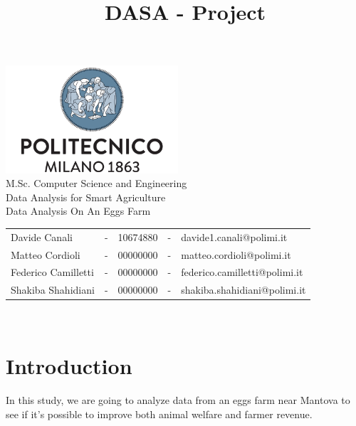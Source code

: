 \documentclass[11pt]{article}
\title{DASA - Project}
\begin{document}
\setlength{\parskip}{1em}

\begin{titlepage}
\centering
\vfill
{
\includegraphics[width =\linewidth, height = 4cm, keepaspectratio]{PolitecnicoLogo.png}
\label{fig:PolitecnicoLogo}
\large \\[2ex]M.Sc. Computer Science and Engineering\\
\large Data Analysis for Smart Agriculture\\[12ex]
\huge
Data Analysis On An Eggs Farm\\[1.5ex]
\large
\vspace{10mm}

\vspace{15mm}
\normalsize

\vspace{30mm}

\begin{tabular}{lclcl}
    Davide Canali & - & 10674880 & - & davide1.canali@polimi.it\\
    Matteo Cordioli & - & 00000000 & - & matteo.cordioli@polimi.it\\
    Federico Camilletti & - & 00000000 & - & federico.camilletti@polimi.it\\
    Shakiba Shahidiani  & - & 00000000 & - & shakiba.shahidiani@polimi.it\\
\end{tabular}

\vspace{30mm}

\@date\\[2.5ex]
}
\end{titlepage}

\makeatother
\tableofcontents
\newpage

\section{Introduction}
In this study, we are going to analyze data from an eggs farm near Mantova to see if it's possible to improve both animal welfare and farmer revenue.
\end{document}
